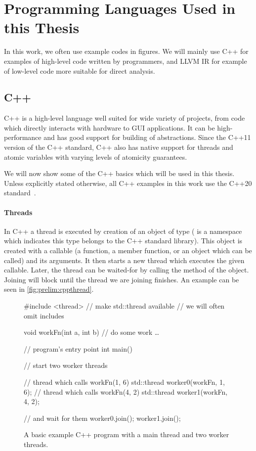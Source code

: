 \section{Programming Languages Used in this Thesis}

In this work, we often use example codes in figures.
We will mainly use C++ for examples of high-level code written by programmers,
and LLVM IR for example of low-level code more suitable for direct analysis.

\subsection{C++}

C++ is a high-level language well suited for wide variety of projects, from
code which directly interacts with hardware to GUI applications.
It can be high-performance and has good support for building of abstractions.
Since the C++11 version of the C++ standard, C++ also has native support for
threads and atomic variables with varying levels of atomicity guarantees.

We will now show some of the C++ basics which will be used in this thesis.
Unless explicitly stated otherwise, all C++ examples in this work use the C++20
standard~\cite{cpp20}.

\paragraph{Threads}

In C++ a thread is executed by creation of an object of type 
( is a namespace which indicates this type belongs to the C++
standard library).
This object is created with a callable (a function, a member function, or an
object which can be called) and its arguments.
It then starts a new thread which executes the given callable.
Later, the thread can be waited-for by calling the  method of the
 object.
Joining will block until the thread we are joining finishes.
An example can be seen in \autoref{fig:prelim:cppthread}.

\begin{figure}[tp]
    \begin{cppcode}
        #include <thread> // make std::thread available
                          // we will often omit includes

        void workFn(int a, int b) {
            // do some work …
        }

        // program's entry point
        int main() {
            // start two worker threads

            // thread which calls workFn(1, 6)
            std::thread worker0(workFn, 1, 6);
            // thread which calls workFn(4, 2)
            std::thread worker1(workFn, 4, 2);

            // and wait for them
            worker0.join();
            worker1.join();
        }
    \end{cppcode}
    \caption{A basic example C++ program with a main thread and two worker
    threads.}\label{fig:prelim:cppthread}
\end{figure}

